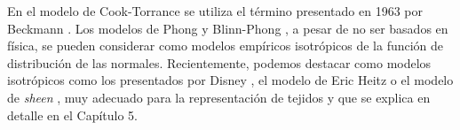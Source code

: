             En el modelo de Cook-Torrance \autocite{cooktorrance} se utiliza el t\'ermino presentado en 1963 por Beckmann \autocite{beckmann}.
            Los modelos de Phong \autocite{phong} y Blinn-Phong \autocite{blinnphong}, a pesar de no ser basados en f\'isica, se pueden considerar
            como modelos emp\'iricos isotr\'opicos de la funci\'on de distribuci\'on de las normales.
            Recientemente, podemos destacar como modelos isotr\'opicos como los presentados por Disney \autocite{disney12}, el modelo
            de Eric Heitz \autocite{ggx} o el modelo de \textit{sheen} \autocite{sheenbrdf}, muy adecuado para la representaci\'on de tejidos
            y que se explica en detalle en el Cap\'itulo 5.\\


            


